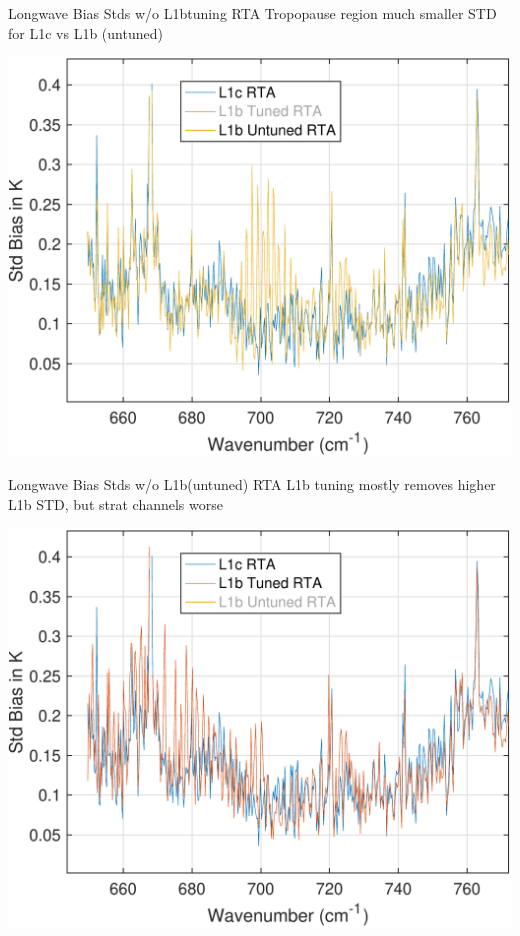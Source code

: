 \documentclass[10pt,t]{beamer}
\begin{document}
\begin{frame}[label={sec:org0f46d77}]{Longwave Bias Stds w/o L1btuning RTA}
Tropopause region much smaller STD for L1c vs L1b (untuned)
\begin{center}
\includegraphics[width=0.75\linewidth]{./std_3rta_lw_noL1btuning.pdf}
\end{center}
\end{frame}
\begin{frame}[label={sec:orga29dad3}]{Longwave Bias Stds w/o L1b(untuned) RTA}
L1b tuning mostly removes higher L1b STD, but strat channels worse
\begin{center}
\includegraphics[width=0.75\linewidth]{./std_3rta_lw_nol1b_untuned.pdf}
\end{center}
\end{frame}
\end{document}
